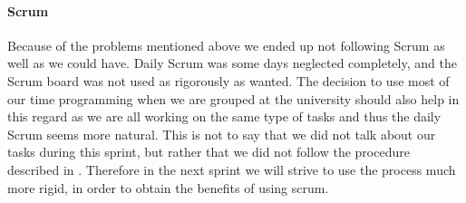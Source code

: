 \paragraph{Scrum}
Because of the problems mentioned above we ended up not following Scrum as well as we could have.
Daily Scrum was some days neglected completely, and the Scrum board was not used as rigorously as wanted.
The decision to use most of our time programming when we are grouped at the university should also help in this regard as we are all working on the same type of tasks and thus the daily Scrum seems more natural.
This is not to say that we did not talk about our tasks during this sprint, but rather that we did not follow the procedure described in .
Therefore in the next sprint we will strive to use the process much more rigid, in order to obtain the benefits of using scrum. 

